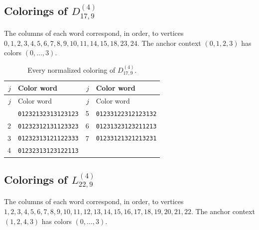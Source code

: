 \documentclass[aps,pra,reprint,superscriptaddress,longbibliography,nofootinbib,floatfix,10pt]{revtex4-2}
\theoremstyle{definition}
\begin{document}
\subsection{Colorings of \texorpdfstring{$D_{17,9}^{(4)}$}{gadget 4e}}
The columns of each word correspond, in order, to vertices $0,\allowbreak 1,\allowbreak 2,\allowbreak 3,\allowbreak 4,\allowbreak 5,\allowbreak 6,\allowbreak 7,\allowbreak 8,\allowbreak 9,\allowbreak 10,\allowbreak 11,\allowbreak 14,\allowbreak 15,\allowbreak 18,\allowbreak 23,\allowbreak 24$. The anchor context $(0,1,2,3)$ has colors $(0,\ldots,3)$.
\begingroup\footnotesize\setlength{\tabcolsep}{3pt}\setlength{\LTpre}{5pt}\setlength{\LTpost}{8pt}
\begin{longtable}{rl@{\qquad}rl}
\caption{Every normalized coloring of $D_{17,9}^{(4)}$.}\label{tab:colors-4e}\\\toprule $j$ & Color word & $j$ & Color word\\\midrule\endfirsthead
\toprule $j$ & Color word & $j$ & Color word\\\midrule\endhead\bottomrule\endfoot
1 & \texttt{01232132313123123} & 5 & \texttt{01233122312123132}\\
2 & \texttt{01232312131123323} & 6 & \texttt{01231323123211213}\\
3 & \texttt{01232313121122333} & 7 & \texttt{01233121321213231}\\
4 & \texttt{01232313123122113} &  & \\
\end{longtable}\endgroup
{}\subsection{Colorings of \texorpdfstring{$L_{22,9}^{(4)}$}{gadget 4f}}
The columns of each word correspond, in order, to vertices $1,\allowbreak 2,\allowbreak 3,\allowbreak 4,\allowbreak 5,\allowbreak 6,\allowbreak 7,\allowbreak 8,\allowbreak 9,\allowbreak 10,\allowbreak 11,\allowbreak 12,\allowbreak 13,\allowbreak 14,\allowbreak 15,\allowbreak 16,\allowbreak 17,\allowbreak 18,\allowbreak 19,\allowbreak 20,\allowbreak 21,\allowbreak 22$. The anchor context $(1,2,4,3)$ has colors $(0,\ldots,3)$.
\begingroup\footnotesize\setlength{\tabcolsep}{3pt}\setlength{\LTpre}{5pt}\setlength{\LTpost}{8pt}
\end{document}
